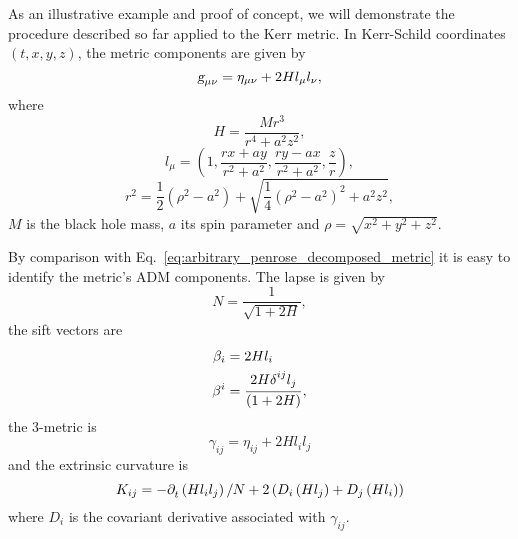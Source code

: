 As an illustrative example and proof of concept, we will demonstrate the procedure described so far applied to the Kerr metric. In Kerr-Schild coordinates $(t,x,y,z)$, the metric components are given by~\cite{PhysRevD.66.084024}
%
\begin{equation}
  \mtrtens{\mu}{\nu} = \eta_{\mu \nu} + 2 H l_\mu l_\nu,
  \label{eq:arbitrary_penrose_kerr_ks_line_element}
\end{equation}
%
where
%
\begin{equation}
  H = \frac{M r^3}{r^4 + a^2 z^2},
  \label{eq:arbitrary_penrose_kerr_ks_H}
\end{equation}
%
\begin{equation}
  l_\mu = \left( 1, \frac{rx + ay}{r^2 + a^2}, \frac{ry - ax}{r^2 + a^2}, \frac{z}{r} \right),
  \label{eq:arbitrary_penrose_kerr_ks_l}
\end{equation}
%
\begin{equation}
  r^2 = \frac{1}{2}\left( \rho^2 - a^2 \right) + \sqrt{\frac{1}{4} \left( \rho^2 - a^2 \right)^2 + a^2z^2},
  \label{eq:arbitrary_penrose_kerr_ks_r}
\end{equation}
%
$M$ is the black hole mass, $a$ its spin parameter and $\rho = \sqrt{x^2 + y^2 + z^2}$.

By comparison with Eq.~\eqref{eq:arbitrary_penrose_decomposed_metric} it is easy to identify the metric's ADM components. The lapse is given by~\cite{PhysRevD.66.084024}
%
\begin{equation}
  N = \frac{1}{\sqrt{1 + 2 H}},
  \label{eq:arbitrary_penrose_kerr_ks_lapse}
\end{equation}
%
the sift vectors are
%
\begin{align}
  \beta_i & = 2 H l_i \label{eq:arbitrary_penrose_kerr_ks_l_shift}                                                      \\
  \beta^i & = \frac{2 H \tens{\delta}{ij}{} l_j }{\left( 1 + 2 H \right)}, \label{eq:arbitrary_penrose_kerr_ks_u_shift}
\end{align}
%
the 3-metric is
%
\begin{equation}
  \gamma_{ij} = \eta_{ij} + 2 H l_i l_j
  \label{eq:arbitrary_penrose_kerr_ks_3_metric}
\end{equation}
%
and the extrinsic curvature is
%
\begin{equation}
  K_{ij} = -\indexdel{t}\left( H l_i l_j \right)/N + 2 \left( D_i \left( H l_j \right) + D_j \left( H l_i \right) \right)
  \label{eq:arbitrary_penrose_kerr_ks_3_metric}
\end{equation}
%
where $D_i$ is the covariant derivative associated with $\gamma_{ij}$.

